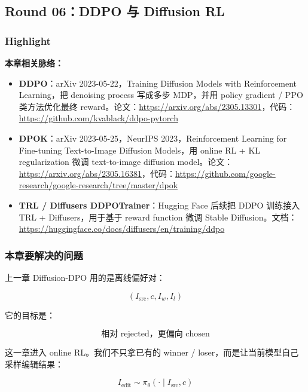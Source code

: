 
\subsection{Round 06：DDPO 与 Diffusion RL}

\subsubsection{Highlight}

\begin{conceptbox}
\textbf{本章相关脉络：}
\begin{itemize}[leftmargin=1.5em]
  \item \textbf{DDPO}：arXiv 2023-05-22，Training Diffusion Models with Reinforcement Learning，把 denoising process 写成多步 MDP，并用 policy gradient / PPO 类方法优化最终 reward。论文：\url{https://arxiv.org/abs/2305.13301}，代码：\url{https://github.com/kvablack/ddpo-pytorch}
  \item \textbf{DPOK}：arXiv 2023-05-25，NeurIPS 2023，Reinforcement Learning for Fine-tuning Text-to-Image Diffusion Models，用 online RL + KL regularization 微调 text-to-image diffusion model。论文：\url{https://arxiv.org/abs/2305.16381}，代码：\url{https://github.com/google-research/google-research/tree/master/dpok}
  \item \textbf{TRL / Diffusers DDPOTrainer}：Hugging Face 后续把 DDPO 训练接入 TRL + Diffusers，用于基于 reward function 微调 Stable Diffusion。文档：\url{https://huggingface.co/docs/diffusers/en/training/ddpo}
\end{itemize}
\end{conceptbox}

\subsubsection{本章要解决的问题}

上一章 Diffusion-DPO 用的是离线偏好对：

\[
(I_\text{src},c,I_w,I_l)
\]

它的目标是：

\[
\text{相对 rejected，更偏向 chosen}
\]

这一章进入 online RL。我们不只拿已有的 winner / loser，而是让当前模型自己采样编辑结果：

\[
I_\text{edit}
\sim
\pi_\theta(\cdot\mid I_\text{src},c)
\]


